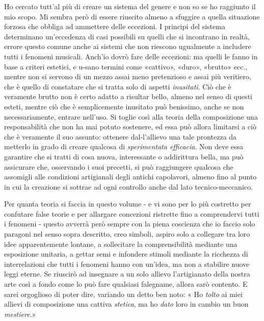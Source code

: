 \documentclass{../../lib/gs}
\begin{document}
Ho cercato tutt'al più di creare un sistema del genere e non so se ho raggiunto il mio scopo. Mi sembra però di essere riuscito almeno a sfuggire a quella situazione forzosa che obbliga ad ammettere delle eccezioni.
I principi del sistema determinano un'eccedenza di casi possibili su quelli che si incontrano in realtà, errore questo comune anche ai sistemi che non riescono ugualmente a includere tutti i fenomeni musicali. Anch'io dovrò fare delle eccezioni: ma quelli le fanno in base a criteri estetici, e u-sano termini come «cattivo», «duro», «brutto» ecc., mentre non si servono di un mezzo assai meno pretenzioso e assai più veritiero, che è quello di constatare che si tratta solo di aspetti \emph{inusitati}. Ciò che è veramente brutto non è certo adatto a risultar bello, almeno nel senso di questi esteti, mentre ciò che è semplicemente inusitato può benissimo, anche se non necessariamente, entrare nell'uso. Si toglie così alla teoria della composizione una responsabilità che non ha mai potuto sostenere, ed essa può allora limitarsi a ciò che è veramente il suo assunto: ottenere dal-l'allievo una tale prontezza da metterlo in grado di creare qualcosa di \emph{sperimentata efficacia}. Non deve essa garantire che si tratti di cosa nuova, interessante o addirittura bella, ma può assicurare che, osservando i suoi precetti, si può raggiungere qualcosa che assomigli alle condizioni artigianali degli antichi capolavori, almeno fino al punto in cui la creazione si sottrae ad ogni controllo anche dal lato tecnico-meccanico.

Per quanta teoria si faccia in questo volume - e vi sono per lo più costretto per confutare false teorie e per allargare concezioni ristrette fino a comprendervi tutti i fenomeni - questo avverrà però sempre con la piena coscienza che io faccio solo paragoni nel senso sopra descritto, creo simboli, aspiro solo a collegare tra loro idee apparentemente lontane, a sollecitare la comprensibilità mediante una esposizione unitaria, a gettar semi e infondere stimoli mediante la ricchezza di interrelazioni che tutti i fenomeni hanno con un'idea, ma non a stabilire nuove leggi eterne. Se riuscirò ad insegnare a un solo allievo l'artigianato della nostra arte così a fondo come lo può fare qualsiasi falegname, allora sarò contento. E sarei orgoglioso di poter dire, variando un detto ben noto: « Ho \emph{tolto} ai miei allievi di composizione una cattiva \emph{stetica}, ma ho \emph{dato} loro in cambio un buon \emph{mestiere}.»

\clearpage
\thispagestyle{plain}
\tableofcontents

\clearpage

\nocite{*}
\printbibliography
\end{document}
